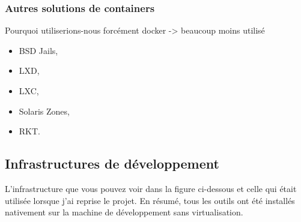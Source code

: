 \documentclass[
    iai, %
    il, %
]{heig-tb}
\begin{document}



\subsubsection{Autres solutions de containers}
Pourquoi utiliserions-nous forcément \Gls{docker}
-> beaucoup moins utilisé

\begin{itemize}
    \item BSD Jails, %
    \item LXD, %
    \item LXC, %
    \item Solaris Zones, %
    \item RKT. %
\end{itemize}

\subsection{Infrastructures de développement}



L'infrastructure que vous pouvez voir dans la figure ci-dessous et celle qui était utilisée lorsque j'ai reprise le projet.
En résumé, tous les outils ont été installés nativement sur la machine de développement sans virtualisation.

\end{document}
